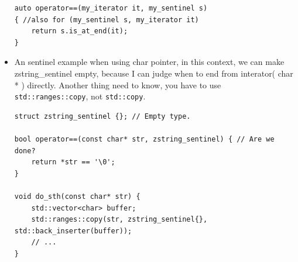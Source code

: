 \documentclass[a4paper,11pt,twoside]{book}
\begin{document}
\begin{itemize}
\begin{lstlisting}
auto operator==(my_iterator it, my_sentinel s)  
{ //also for (my_sentinel s, my_iterator it)
	return s.is_at_end(it); 
}	
\end{lstlisting}

	\item An sentinel example when using char pointer, in this context, we can make zstring\_sentinel empty, because I can judge when to end from interator( char * ) directly. Another thing need to know, you have to use \texttt{std::ranges::copy}, not \texttt{std::copy}.

\begin{lstlisting}
struct zstring_sentinel {}; // Empty type.

bool operator==(const char* str, zstring_sentinel) { // Are we done?
	return *str == '\0';
}

void do_sth(const char* str) {
	std::vector<char> buffer;
	std::ranges::copy(str, zstring_sentinel{}, std::back_inserter(buffer));
	// ...
}	
\end{lstlisting}

\end{itemize}
\end{document}
